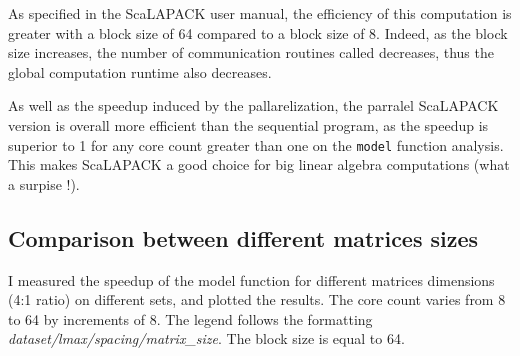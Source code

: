\documentclass{article}
\begin{document}
\par As specified in the ScaLAPACK user manual, the efficiency of this computation is greater with a block size of 64 compared to a block size of 8. Indeed, as the block size increases, the number of communication routines called decreases, thus the global computation runtime also decreases.
\par As well as the speedup induced by the pallarelization, the parralel ScaLAPACK version is overall more efficient than the sequential program, as the speedup is superior to 1 for any core count greater than one on the \verb |model| function analysis. This makes ScaLAPACK a good choice for big linear algebra computations (what a surpise !).

\subsection{Comparison between different matrices sizes}

\par I measured the speedup of the model function for different matrices dimensions (4:1 ratio) on different sets, and plotted the results. The core count varies from 8 to 64 by increments of 8. The legend follows the formatting \textit{dataset/lmax/spacing/matrix\_size}. The block size is equal to 64. \\
\end{document}
